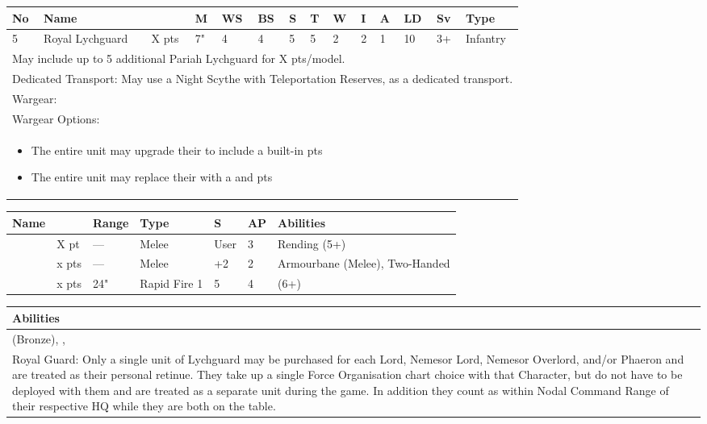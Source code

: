 \newpage
{}

\noindent
\begin{tabular}{||m{10pt} m{95pt} m{30pt} m{11pt} m{11pt} m{11pt} m{11pt} m{11pt} m{11pt} m{11pt} m{11pt} m{11pt} m{11pt} m{125pt}||}
	\hline
	No & Name & & M & WS & BS & S & T & W & I & A & LD & Sv & Type \\
	\hline
	5 & Royal Lychguard & X pts & 7" & 4 & 4 & 5 & 5 & 2 & 2 & 1 & 10 & 3+ & Infantry\\
	\hline
	\hline
	\multicolumn{14}{||Z{532 pt}||}{May include up to 5 additional Pariah Lychguard for X pts/model.}\\	
	\multicolumn{14}{||Z{532 pt}||}{Dedicated Transport: May use a Night Scythe with Teleportation Reserves, as a dedicated transport.}\\	
	\hline
	\hline
	\multicolumn{14}{||Z{532 pt}||}{Wargear: \quickref{Warscythe}}\\
	\multicolumn{14}{||Z{532 pt}||}{Wargear Options:} \\
	\multicolumn{14}{||Z{532 pt}||}{\begin{itemize}
			\item The entire unit may upgrade their \quickref{Warscythe} to include a built-in \quickref{Gauss Blaster} \hrulefill 5 pts
			\item The entire unit may replace their \quickref{Warscythe} with a \quickref{Hyperphase Sword} and \quickref{Dispersion Shield} \hrulefill 10 pts
	\end{itemize}} \\
	\hline
\end{tabular}

\noindent
\begin{tabular}{||m{110pt} m{30pt} m{31pt} m{55pt} m{12pt} m{12pt} m{210pt}||}
	\hline
	Name & & Range & Type & S & AP & Abilities \\
	\hline
	\quickref{Hyperphase Sword} & X pt & — & Melee & User & 3 & Rending (5+) \\
	\quickref{Warscythe} & x pts& — & Melee & +2 & 2 & Armourbane (Melee), Two-Handed \\
	\quickref{Gauss Blaster} & x pts& 24" & Rapid Fire 1 & 5 & 4 & \quickref{Gauss} (6+) \\
	\hline
\end{tabular}

\noindent
\begin{tabular}{||m{532pt}||}
	\hline
	Abilities \\
	\hline
	\quickref{Awakening Protocols} (Bronze), \quickref{Living Metal}, \quickref{Reanimation Protocols} \\
	Royal Guard: Only a single unit of Lychguard may be purchased for each Lord, Nemesor Lord, Nemesor Overlord, and/or Phaeron and are treated as their personal retinue. They take up a single Force Organisation chart choice with that Character, but do not have to be deployed with them and are treated as a separate unit during the game. In addition they count as within Nodal Command Range of their respective HQ while they are both on the table. \\
	\hline
\end{tabular}





